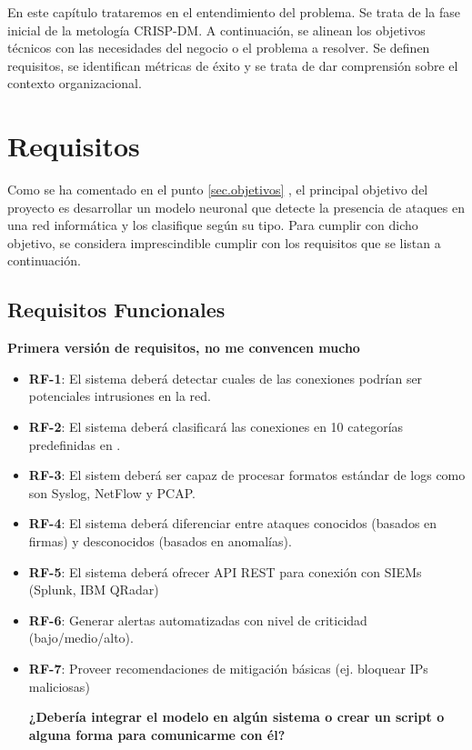 En este capítulo trataremos en el entendimiento del problema. Se trata de la fase inicial de la metología CRISP-DM. A continuación, se alinean los objetivos técnicos con las necesidades del negocio o el problema a resolver. Se definen requisitos, se identifican métricas de éxito y se trata de dar comprensión sobre el contexto organizacional.
 
\section{Requisitos}  \label{sec.requisitos} 
Como se ha comentado en el punto \ref{sec.objetivos} , 
el principal objetivo del proyecto es desarrollar un modelo neuronal que detecte la presencia de ataques en una red informática y los clasifique según su tipo. Para cumplir con dicho objetivo, se considera imprescindible cumplir con los requisitos que se listan a continuación.

\subsection{Requisitos Funcionales}   \label{sec.req-funcionales}
\textbf{Primera versión de requisitos, no me convencen mucho}
\begin{itemize}  
    \item \textbf{RF-1}: El sistema deberá detectar cuales de las conexiones podrían ser potenciales intrusiones en la red.
    \item \textbf{RF-2}: El sistema deberá clasificará las conexiones en 10 categorías predefinidas en .  
	\item \textbf{RF-3}: El sistem deberá ser capaz de procesar formatos estándar de logs como son Syslog, NetFlow y PCAP.
	\item \textbf{RF-4}: El sistema deberá diferenciar entre ataques conocidos (basados en firmas) y desconocidos (basados en anomalías).
	\item \textbf{RF-5}: El sistema deberá ofrecer API REST para conexión con SIEMs (Splunk, IBM QRadar)
	\item \textbf{RF-6}: Generar alertas automatizadas con nivel de criticidad (bajo/medio/alto).
	\item \textbf{RF-7}: Proveer recomendaciones de mitigación básicas (ej. bloquear IPs maliciosas)

	
	
\textbf{¿Debería integrar el modelo en algún sistema o crear un script o alguna forma para comunicarme con él?}
		
\end{itemize}  

